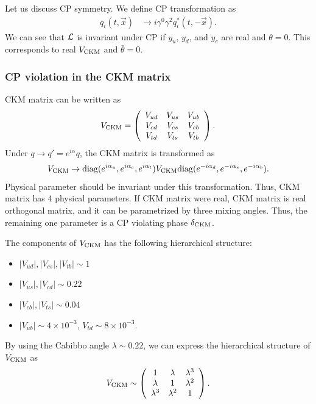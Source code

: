 \documentclass[11pt,a4paper]{article}
\begin{document}
Let us discuss CP symmetry. We define CP transformation as
\begin{align}
    q_{i}(t,\vec x) &\to i \gamma^0 \gamma^2 q_{i}^*(t, -\vec x).
\end{align}
We can see that ${\cal L}$ is invariant under CP if $y_u$, $y_d$, and $y_e$ are real and $\theta=0$.
This corresponds to real $V_{\rm CKM}$ and $\bar\theta=0$.

\subsubsection{CP violation in the CKM matrix}
CKM matrix can be written as
\begin{align}
    V_{\rm CKM} = \left(\begin{array}{ccc}
        V_{ud} & V_{us} & V_{ub} \\
        V_{cd} & V_{cs} & V_{cb} \\
        V_{td} & V_{ts} & V_{tb}
    \end{array}\right).
\end{align}
Under $q \to q' = e^{i\alpha} q$, the CKM matrix is transformed as
\begin{align}
    V_{\rm CKM} \to {\rm diag}(e^{i\alpha_u}, e^{i\alpha_c}, e^{i\alpha_t}) V_{\rm CKM} {\rm diag}(e^{-i\alpha_d}, e^{-i\alpha_s}, e^{-i\alpha_b}).
\end{align}
Physical parameter should be invariant under this transformation. Thus, CKM matrix has 4 physical parameters.
If CKM matrix were real, CKM matrix is real orthogonal matrix, and it can be parametrized by three mixing angles. Thus, the remaining one parameter is a CP violating phase $\delta_{\rm CKM}$.

The components of $V_{\rm CKM}$ has the following hierarchical structure:
\begin{itemize}
    \item $|V_{ud}|, |V_{cs}|, |V_{tb}| \sim 1$
    \item $|V_{us}|, |V_{cd}| \sim 0.22$
    \item $|V_{cb}|, |V_{ts}| \sim 0.04$
    \item $|V_{ub}| \sim 4 \times 10^{-3}$, $V_{td} \sim 8 \times 10^{-3}$.
\end{itemize}
By using the Cabibbo angle $\lambda \sim 0.22$, we can express the hierarchical structure of $V_{\rm CKM}$ as
\begin{align}
    V_{\rm CKM} \sim \left(\begin{array}{ccc}
        1 & \lambda & \lambda^3 \\
        \lambda & 1 & \lambda^2 \\
        \lambda^3 & \lambda^2 & 1
    \end{array}\right).
\end{align}
\end{document}
